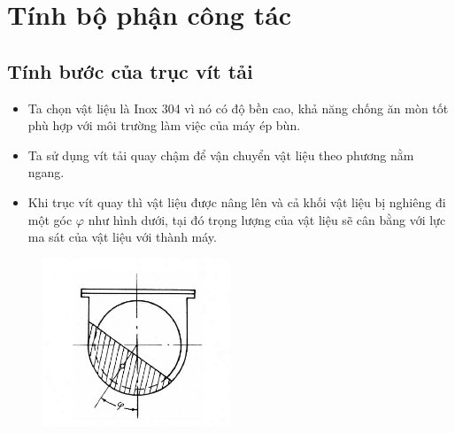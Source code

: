 \section{Tính bộ phận công tác}
\subsection{Tính bước của trục vít tải}
\begin{itemize}
    \item Ta chọn vật liệu là Inox 304 vì nó có độ bền cao, khả năng chống ăn mòn tốt phù hợp với môi trường làm việc của máy ép bùn.
    \item Ta sử dụng vít tải quay chậm để vận chuyển vật liệu theo phương nằm ngang. 
    \item Khi trục vít quay thì vật liệu được nâng lên và cả khối vật liệu bị nghiêng đi một góc $\varphi $ như hình dưới, tại đó trọng lượng của vật liệu sẽ cân bằng với lực ma sát của vật liệu với thành máy.
\end{itemize}
\begin{figure}[H]
    \centering
    \includegraphics[width=0.5\textwidth]{pictures/vittai1.png}
\end{figure}
